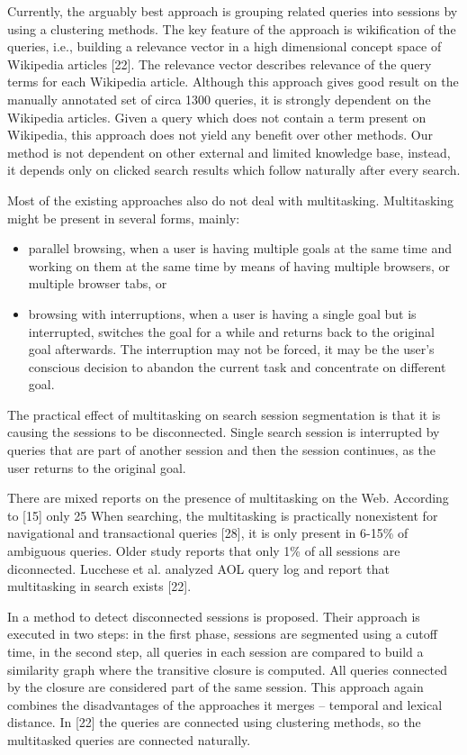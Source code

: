 \documentclass{acm_proc_article-sp} %
\begin{document}
Currently, the arguably best approach is grouping related
queries into sessions by using a clustering methods. The
key feature of the approach is wikification of the queries,
i.e., building a relevance vector in a high dimensional concept
space of Wikipedia articles [22]. The relevance vector
describes relevance of the query terms for each Wikipedia
article. Although this approach gives good result on the
manually annotated set of circa 1300 queries, it is strongly
dependent on the Wikipedia articles. Given a query which
does not contain a term present on Wikipedia, this approach
does not yield any benefit over other methods. Our method
is not dependent on other external and limited knowledge
base, instead, it depends only on clicked search results which
follow naturally after every search.

Most of the existing approaches also do not deal with multitasking.
Multitasking might be present in several forms,
mainly:

\begin{itemize} 
	\item parallel browsing, when a user is having multiple goals
	at the same time and working on them at the same
	time by means of having multiple browsers, or multiple
	browser tabs, or
	\item browsing with interruptions, when a user is having a
	single goal but is interrupted, switches the goal for a
	while and returns back to the original goal afterwards.
	The interruption may not be forced, it may be the
	user’s conscious decision to abandon the current task
	and concentrate on different goal.
\end{itemize}

The practical effect of multitasking on search session segmentation
is that it is causing the sessions to be disconnected.
Single search session is interrupted by queries that
are part of another session and then the session continues,
as the user returns to the original goal.

There are mixed reports on the presence of multitasking on
the Web. According to [15] only 25%
When searching, the multitasking is practically nonexistent
for navigational and transactional queries [28], it is only
present in 6-15\% of ambiguous queries. Older study \cite{Buzikashvili:1} reports
that only 1\% of all sessions are diconnected. Lucchese
et al. analyzed AOL query log and report that multitasking
in search exists [22].

In \cite{Buzikashvili:1} a method to detect disconnected sessions is proposed.
Their approach is executed in two steps: in the first phase,
sessions are segmented using a cutoff time, in the second
step, all queries in each session are compared to build a similarity
graph where the transitive closure is computed. All
queries connected by the closure are considered part of the
same session. This approach again combines the disadvantages
of the approaches it merges – temporal and lexical
distance. In [22] the queries are connected using clustering
methods, so the multitasked queries are connected naturally.
\end{document}
